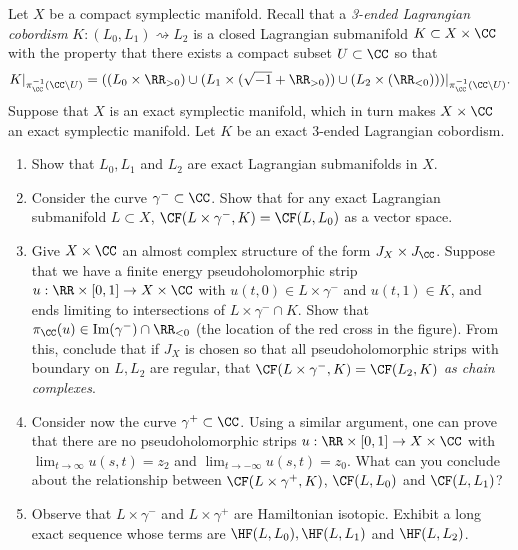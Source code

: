 
 
 
Let $X$ be a compact symplectic manifold. Recall that a \emph{3-ended Lagrangian cobordism} $K: (L_0, L_1)\rightsquigarrow L_2$ is a closed Lagrangian submanifold $K\subset X\times \CC$ with the property that there exists a compact subset $U\subset \CC$ so that \[K|_{\pi_\CC^{-1}(\CC\setminus U)}=((L_0\times \RR_{>0})\cup( L_1\times (\sqrt{-1}+\RR_{>0}) )\cup( L_2\times (\RR_{<0})))|_{\pi_\CC^{-1}(\CC\setminus U)}.\]
Suppose that $X$ is an exact symplectic manifold, which in turn makes $X\times \CC$ an exact symplectic manifold. Let $K$ be an exact 3-ended Lagrangian cobordism. 
    
\begin{enumerate}
    \item Show that $L_0, L_1$ and $L_2$ are exact Lagrangian submanifolds in $X$.
    \item Consider the curve $\gamma^-\subset \CC$. Show that for any exact Lagrangian submanifold $L\subset X$, $\CF(L\times \gamma^-, K)=\CF(L, L_0)$ as a vector space. 
    \item Give $X\times \CC$ an almost complex structure of the form $J_X\times J_\CC$. Suppose that we have a finite energy pseudoholomorphic strip $u: \RR\times [0, 1]\to X\times \CC$ with $u(t, 0)\in L\times \gamma^-$ and $u(t, 1)\in K$, and ends limiting to intersections of $L\times \gamma^-\cap K$. Show that $\pi_\CC(u)\in \text{Im}(\gamma^-)\cap \RR_{<0}$ (the location of the red cross in the figure). From this, conclude that if $J_X$ is chosen so that all pseudoholomorphic strips with boundary on $L, L_2$ are regular, that $\CF(L\times \gamma^-, K) = \CF(L_2, K)$ \emph{as chain complexes}.
        
    \item Consider now the curve $\gamma^+\subset \CC$. Using a similar argument, one can prove that there are no pseudoholomorphic strips $u:\RR\times [0, 1]\to X\times \CC$ with $\lim_{t\to\infty} u(s, t)=z_2$ and $\lim_{t\to-\infty} u(s, t)=z_0$. What can you conclude about the relationship between $\CF(L\times \gamma^+, K)$, $\CF(L, L_0)$ and $\CF(L, L_1)$?
        
    \item Observe that $L\times \gamma^-$ and $L\times \gamma^+$ are Hamiltonian isotopic. Exhibit a long exact sequence whose terms are $\HF(L, L_0), \HF(L, L_1)$ and $\HF(L, L_2)$.
\end{enumerate}

 